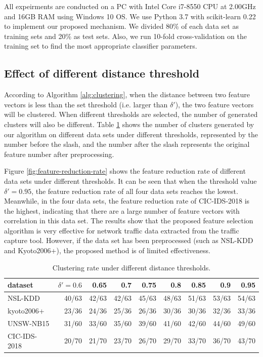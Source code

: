 \documentclass{ieeeaccess}
\theoremstyle{definition}
\begin{document}
All expeirments are conducted on a PC with Intel Core i7-8550 CPU at 2.00GHz and 16GB RAM using Windows 10 OS. We use Python 3.7 with scikit-learn 0.22 \cite{sklearn} to implement our proposed mechanism. We divided 80\% of each data set as training sets and 20\% as test sets. Also, we run 10-fold cross-validation on the training set to find the most appropriate classifier parameters.

\subsection{Effect of different distance threshold}

According to Algorithm \ref{alg:clustering}, when the distance between two feature vectors is less than the set threshold (i.e. larger than $\delta'$), the two feature vectors will be clustered. When different thresholds are selected, the number of generated clusters will also be different. Table \ref{tab:clustering-rate} shows the number of clusters generated by our algorithm on different data sets under different thresholds, represented by the number before the slash, and the number after the slash represents the original feature number after preprocessing.

Figure \ref{fig:feature-reduction-rate} shows the feature reduction rate of different data sets under different thresholds. It can be seen that when the threshold value $\delta' = 0.95$, the feature reduction rate of all four data sets reaches the lowest. Meanwhile, in the four data sets, the feature reduction rate of CIC-IDS-2018 is the highest, indicating that there are a large number of feature vectors with correlation in this data set. The results show that the proposed feature selection algorithm is very effective for network traffic data extracted from the traffic capture tool. However, if the data set has been preprocessed (such as NSL-KDD and Kyoto2006+), the proposed method is of limited effectiveness.

\begin{table}[htbp]
    \centering
    \caption{Clustering rate under different distance thresholds.}
    \begin{tabular}{lrrrrrrrr}
        \toprule
        dataset & $\delta'=0.6$ & 0.65 & 0.7 & 0.75 & 0.8 & 0.85 & 0.9 & 0.95 \\
        \midrule
        NSL-KDD & 40/63 & 42/63 & 42/63 & 45/63 & 48/63 & 51/63 & 53/63 & 54/63 \\
        kyoto2006+ & 23/36 & 24/36 & 25/36 & 26/36 & 30/36 & 30/36 & 32/36 & 33/36 \\
        UNSW-NB15 & 31/60 & 33/60 & 35/60 & 39/60 & 41/60 & 42/60 & 44/60 & 49/60 \\
        CIC-IDS-2018 & 20/70 & 21/70 & 23/70 & 26/70 & 29/70 & 33/70 & 36/70 & 43/70 \\
        \bottomrule
    \end{tabular}%
    \label{tab:clustering-rate}%
\end{table}%
\end{document}
